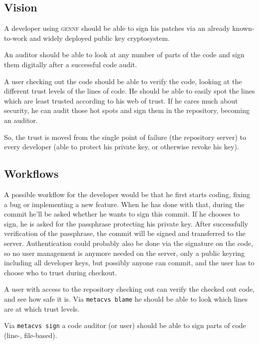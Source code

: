 \documentclass[fleqn, 10pt, a4paper]{article}
\begin{document}
\subsection{Vision}
A developer using \textsc{gennf} should be able to sign his patches via
an already known-to-work and widely deployed public key cryptosystem.

An auditor should be able to look at any number of parts of the code
and sign them digitally after a successful code audit.

A user checking out the code should be able to verify the code, looking
at the different trust levels of the lines of code.
He should be able to easily spot the lines
which are least trusted according to his web of trust. If he cares much
about security, he can audit those hot spots and sign them in the repository,
becoming an auditor.

So, the trust is moved from the single point of failure (the repository
server) to every developer (able to protect his private key, or otherwise
revoke his key).

\subsection{Workflows}

A possible workflow for the developer would be that he first starts coding,
fixing a bug or implementing a new feature. When he has done with that,
during the commit he'll be asked whether he wants to sign this commit.
If he chooses to sign, he is asked for the passphrase protecting
his private key. After successfully verification of the passphrase,
the commit will be signed and transferred to the server.
Authentication could probably also be done via the signature on the code,
so no user management is anymore needed on the server, only a public keyring
including all developer keys, but possibly anyone can commit, and the user
has to choose who to trust during checkout.

A user with access to the repository checking out can verify the checked
out code, and see how safe it is.
Via \texttt{metacvs blame} he should be able to look which lines are
at which trust levels.

Via \texttt{metacvs sign} a code auditor (or user) should be able to
sign parts of code (line-, file-based).
\end{document}
